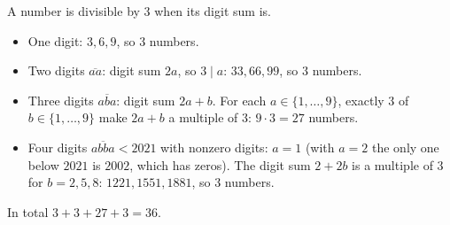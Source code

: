 A number is divisible by $3$ when its digit sum is.
\begin{itemize}
\item One digit: $3,6,9$, so $3$ numbers.
\item Two digits $\overline{aa}$: digit sum $2a$, so $3\mid a$: $33,66,99$, so $3$ numbers.
\item Three digits $\overline{aba}$: digit sum $2a+b$. For each $a\in\{1,\dots,9\}$, exactly $3$ of $b\in\{1,\dots,9\}$ make $2a+b$ a multiple of $3$: $9\cdot3=27$ numbers.
\item Four digits $\overline{abba}<2021$ with nonzero digits: $a=1$ (with $a=2$ the only one below $2021$ is $2002$, which has zeros). The digit sum $2+2b$ is a multiple of $3$ for $b=2,5,8$: $1221,1551,1881$, so $3$ numbers.
\end{itemize}
In total $3+3+27+3=\boxed{36}$.
